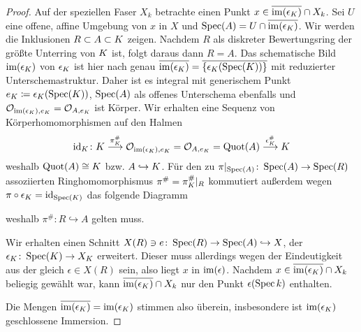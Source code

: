 \documentclass[german]{scrreprt}
\begin{document}
\begin{Bemerkung}
\begin{proof}
    Auf der speziellen Faser $X_k$ betrachte einen Punkt
    $x\in\overline{\operatorname{im}(\epsilon_{K})}\cap X_k$. Sei $U$ eine
    offene, affine Umgebung von $x$ in $X$ und
    $\operatorname{Spec}(A)=U\cap\overline{\operatorname{im}(\epsilon_{K})}$.
    Wir werden die Inklusionen $R\subset A\subset K$ zeigen.
    Nachdem $R$ als diskreter Bewertungsring der größte Unterring
    von $K$ ist, folgt daraus dann $R=A$.
    Das schematische Bild $\text{im}(\epsilon_{K})$ von $\epsilon_{K}$ ist
    hier nach \cite[Remark 10.32]{wedhorn} genau
    $\overline{\operatorname{im}(\epsilon_{K})}=\overline{\{\epsilon_{K}(\operatorname{Spec}(K))\}}$
    mit reduzierter Unterschemastruktur. Daher ist es integral mit
    generischem Punkt $e_{K}\coloneqq\epsilon_{K}(\operatorname{Spec}(K))$,
    $\operatorname{Spec}(A)$ als offenes Unterschema ebenfalls und
    $\mathcal{O}_{\text{im}(\epsilon_{K}), e_{K}}=\mathcal{O}_{A,e_{K}}$ ist Körper.
    Wir erhalten eine Sequenz von Körperhomomorphismen auf den Halmen
    \begin{gather*}
      \mathrm{id}_{K}\colon
      K \overset{\pi_{K}^\#}{\longrightarrow}
      \mathcal{O}_{\text{im}(\epsilon_{K}), e_{K}} = \mathcal{O}_{A,e_{K}} = \operatorname{Quot}(A)
      \overset{\epsilon_{K}^\#}{\longrightarrow} K
    \end{gather*}
    weshalb $\operatorname{Quot}(A)\cong K$ bzw. $A\hookrightarrow K$.
    Für den zu $\pi|_{\operatorname{Spec}(A)}\colon\operatorname{Spec}(A)\to\operatorname{Spec}(R)$ assoziierten
    Ringhomomorphismus $\pi^\#=\pi_{K}^\#|_R$ kommutiert außerdem wegen
    $\pi\circ\epsilon_{K}=\mathrm{id}_{\operatorname{Spec}(K)}$ das folgende Diagramm
    \begin{center}
    \end{center}
    weshalb $\pi^\#\colon R\hookrightarrow A$ gelten muss.
    
    Wir erhalten einen Schnitt
    $X(R)\ni e\colon\operatorname{Spec}(R)\to\operatorname{Spec}(A)\hookrightarrow X$,
    der $\epsilon_{K}\colon\operatorname{Spec}(K)\to X_{K}$ erweitert.
    Dieser muss allerdings wegen der Eindeutigkeit aus der \NAbbEig
    gleich $\epsilon\in X(R)$ sein, also liegt $x$ in $\operatorname{im}(\epsilon)$.
    Nachdem $x\in \overline{\operatorname{im}(\epsilon_{K})}\cap X_k$ beliegig
    gewählt war, kann $\overline{\operatorname{im}(\epsilon_{K})}\cap X_k$ nur den
    Punkt $\epsilon(\operatorname{Spec} k)$ enthalten.

    Die Mengen $\overline{\operatorname{im}(\epsilon_{K})}=\operatorname{im}(\epsilon_{K})$ stimmen
    also überein, insbesondere ist $\operatorname{im}(\epsilon_{K})$ geschlossene
    Immersion.
  \end{proof}
\end{Bemerkung}
\end{document}
